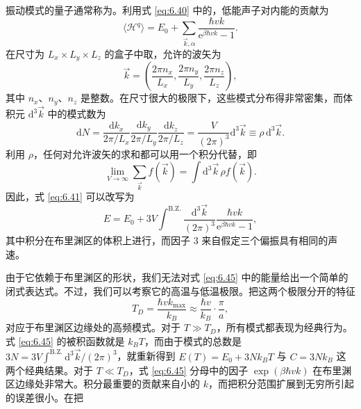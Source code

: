 振动模式的量子通常称为。利用式 \eqref{eq:6.40} 中的，低能声子对内能的贡献为
\begin{equation}\label{eq:6.41}
\langle\mathscr H^q\rangle=E_0+\sum_{\vec k,\alpha}\frac{\hbar vk}{\mathrm e^{\beta\hbar vk}-1}.
\end{equation}
在尺寸为 $L_x\times L_y\times L_z$ 的盒子中取，允许的波矢为
\begin{equation}\label{eq:6.42}
\vec k=\left(\frac{2\pi n_x}{L_x},\frac{2\pi n_y}{L_y},\frac{2\pi n_z}{L_z}\right),
\end{equation}
其中 $n_x$、$n_y$、$n_z$ 是整数。在尺寸很大的极限下，这些模式分布得非常密集，而体积元 $\mathrm d^3\vec k$ 中的模式数为
\begin{equation}\label{eq:6.43}
\mathrm dN=\frac{\mathrm dk_x}{2\pi/L_x}\frac{\mathrm dk_y}{2\pi/L_y}\frac{\mathrm dk_z}{2\pi/L_z}=\frac V{(2\pi)^3}\mathrm d^3\vec k\equiv\rho\,\mathrm d^3\vec k.
\end{equation}
利用 $\rho$，任何对允许波矢的求和都可以用一个积分代替，即
\begin{equation}\label{eq:6.44}
\lim_{V\to\infty}\sum_{\vec k}f(\vec k)=\int\mathrm d^3\vec k\,\rho f(\vec k).
\end{equation}
因此，式 \eqref{eq:6.41} 可以改写为
\begin{equation}\label{eq:6.45}
E=E_0+3V\int^{\text{B.Z.}}\frac{\mathrm d^3\vec k}{(2\pi)^3}\frac{\hbar vk}{\mathrm e^{\beta\hbar vk}-1},
\end{equation}
其中积分在布里渊区的体积上进行，而因子 3 来自假定三个偏振具有相同的声速。

由于它依赖于布里渊区的形状，我们无法对式 \eqref{eq:6.45} 中的能量给出一个简单的闭式表达式。不过，我们可以考察它的高温与低温极限。把这两个极限分开的特征
\begin{equation}\label{eq:6.46}
T_D=\frac{\hbar vk_{\text{max}}}{k_B}\approx\frac{\hbar v}{k_B}\cdot\frac\pi a,
\end{equation}
对应于布里渊区边缘处的高频模式。对于 $T\gg T_D$，所有模式都表现为经典行为。式 \eqref{eq:6.45} 的被积函数就是 $k_BT$，而由于模式的总数是 $3N=3V\int^{\text{B.Z.}}\mathrm d^3\vec k/(2\pi)^3$，就重新得到 $E(T)=E_0+3Nk_BT$ 与 $C=3Nk_B$ 这两个经典结果。对于 $T\ll T_D$，式 \eqref{eq:6.45} 分母中的因子 $\exp(\beta\hbar vk)$ 在布里渊区边缘处非常大。积分最重要的贡献来自小的 $k$，而把积分范围扩展到无穷所引起的误差很小。在把

